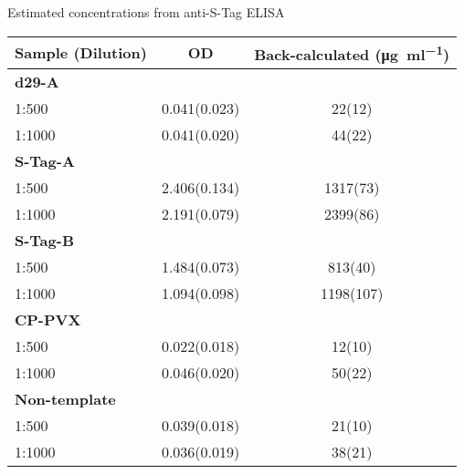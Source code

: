 \begin{supptable}[ht]
    \centering
    \caption{Estimated concentrations from anti-S-Tag ELISA}
    \label{tab:sample_values_elisa_anti_s_tag}
    \begin{tabular}{
        l
        S[table-format=1.3(2),uncertainty-mode=separate]
        S[table-format=4.0(2),uncertainty-mode=separate]
    }
    \toprule
    {\textbf{Sample (Dilution)}} &
    {\textbf{OD}} &
    {\textbf{Back-calculated (\si{\micro\gram\per\milli\litre})}} \\
    \midrule
    \textbf{d29-A} \\
    1:500 & 0.041(0.023) & 22(12) \\
    1:1000 & 0.041(0.020) & 44(22) \\
    \textbf{S-Tag-A} \\
    1:500 & 2.406(0.134) & 1317(73) \\
    1:1000 & 2.191(0.079) & 2399(86) \\
    \textbf{S-Tag-B} \\
    1:500 & 1.484(0.073) & 813(40) \\
    1:1000 & 1.094(0.098) & 1198(107) \\
    \textbf{CP-PVX} \\
    1:500 & 0.022(0.018) & 12(10) \\
    1:1000 & 0.046(0.020) & 50(22) \\
    \textbf{Non-template} \\
    1:500 & 0.039(0.018) & 21(10) \\
    1:1000 & 0.036(0.019) & 38(21) \\
    \bottomrule
    \end{tabular}
\end{supptable}

